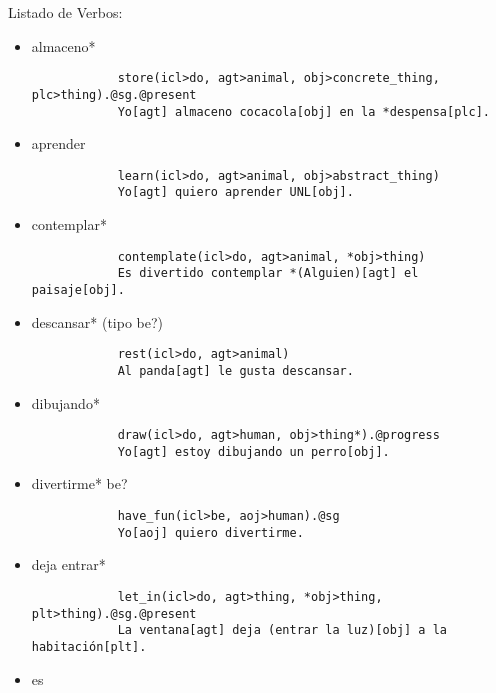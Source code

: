 \documentclass{article}
\begin{document}
    Listado de Verbos:
    \begin{itemize}
        \item almaceno*
        \begin{verbatim}
            store(icl>do, agt>animal, obj>concrete_thing, plc>thing).@sg.@present
            Yo[agt] almaceno cocacola[obj] en la *despensa[plc].
        \end{verbatim}
        \item aprender
        \begin{verbatim}
            learn(icl>do, agt>animal, obj>abstract_thing)
            Yo[agt] quiero aprender UNL[obj].
        \end{verbatim}
        \item contemplar*
        \begin{verbatim}
            contemplate(icl>do, agt>animal, *obj>thing)
            Es divertido contemplar *(Alguien)[agt] el paisaje[obj].
        \end{verbatim}
        \item descansar* (tipo be?)
        \begin{verbatim}
            rest(icl>do, agt>animal)
            Al panda[agt] le gusta descansar.
        \end{verbatim}
        \item dibujando*
        \begin{verbatim}
            draw(icl>do, agt>human, obj>thing*).@progress
            Yo[agt] estoy dibujando un perro[obj].
        \end{verbatim}
        \item divertirme* be?
        \begin{verbatim}
            have_fun(icl>be, aoj>human).@sg
            Yo[aoj] quiero divertirme.
        \end{verbatim}
        \item deja entrar*
        \begin{verbatim}
            let_in(icl>do, agt>thing, *obj>thing, plt>thing).@sg.@present
            La ventana[agt] deja (entrar la luz)[obj] a la habitación[plt].
        \end{verbatim}
        \item es

\end{itemize}
\end{document}
